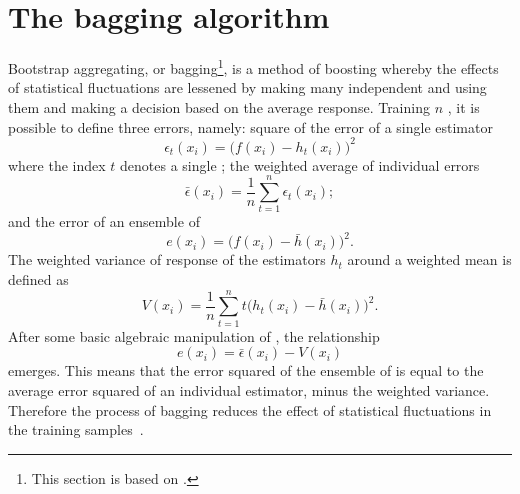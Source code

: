 \section{The bagging algorithm}
\label{sec:bdt:bag}
Bootstrap aggregating, or bagging\footnote{
  This section is based on .}, is a method of boosting whereby the effects of
statistical fluctuations are lessened by making many independent \DTs and using them
and making a decision based on the average response.
Training $n$ \DTs, it is possible to define three errors, namely:
square of the error of a single estimator
\begin{equation}
  \epsilon_t(x_i) = \big(f(x_i)-h_t(x_i)\big)^2
  \label{eq:bdt:bag1}
\end{equation}
where the index $t$ denotes a single \DT;
the weighted average of individual errors
\begin{equation}
  \bar\epsilon(x_i) = \frac1n\sum_{t=1}^n\epsilon_t(x_i);
  \label{eq:bdt:bag2}
\end{equation}
and the error of an ensemble of \DTs
\begin{equation}
  e(x_i) = \big(f(x_i)-\bar h(x_i)\big)^2.
  \label{eq:bdt:bag3}
\end{equation}
The weighted variance of response of the estimators $h_t$ around a weighted mean is defined as
\begin{equation}
  V(x_i) = \frac1n\sum_{t=1}^nt\big(h_t(x_i) - \bar h(x_i)\big)^2.
  \label{eq:bdt:bag4}
\end{equation}
After some basic algebraic manipulation of , the relationship
\begin{equation}
  e(x_i) = \bar\epsilon(x_i) - V(x_i)
  \label{eq:bdt:bag5}
\end{equation}
emerges.
This means that the error squared of the ensemble of \DTs is equal to the average error squared of an
individual estimator, minus the weighted variance.
Therefore the process of bagging reduces the
effect of statistical fluctuations in the training samples~\cite{Krogh95neuralnetwork}.

